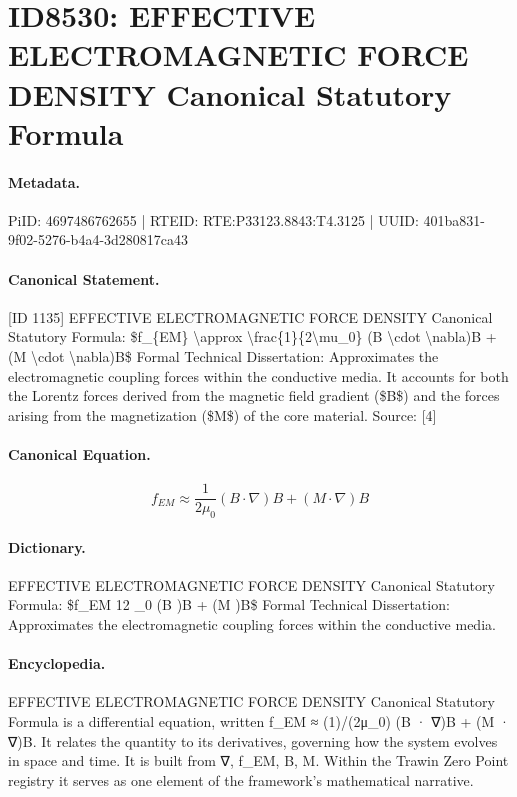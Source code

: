 \section*{ID8530: EFFECTIVE ELECTROMAGNETIC FORCE DENSITY Canonical Statutory Formula}
\paragraph{Metadata.}
PiID: 4697486762655 | RTEID: RTE:P33123.8843:T4.3125 | UUID: 401ba831-9f02-5276-b4a4-3d280817ca43

\paragraph{Canonical Statement.}
[ID 1135] EFFECTIVE ELECTROMAGNETIC FORCE DENSITY Canonical Statutory Formula: \$f\_\{EM\} \textbackslash{}approx \textbackslash{}frac\{1\}\{2\textbackslash{}mu\_0\} (B \textbackslash{}cdot \textbackslash{}nabla)B + (M \textbackslash{}cdot \textbackslash{}nabla)B\$ Formal Technical Dissertation: Approximates the electromagnetic coupling forces within the conductive media. It accounts for both the Lorentz forces derived from the magnetic field gradient (\$B\$) and the forces arising from the magnetization (\$M\$) of the core material. Source: [4]

\paragraph{Canonical Equation.}
\[
f_{EM} \approx \frac{1}{2\mu_0} (B \cdot \nabla)B + (M \cdot \nabla)B
\]

\paragraph{Dictionary.}
EFFECTIVE ELECTROMAGNETIC FORCE DENSITY Canonical Statutory Formula: \$f\_EM 12 \_0 (B )B + (M )B\$ Formal Technical Dissertation: Approximates the electromagnetic coupling forces within the conductive media.

\paragraph{Encyclopedia.}
EFFECTIVE ELECTROMAGNETIC FORCE DENSITY Canonical Statutory Formula is a differential equation, written f\_EM ≈ (1)/(2μ\_0) (B · ∇)B + (M · ∇)B. It relates the quantity to its derivatives, governing how the system evolves in space and time. It is built from ∇, f\_EM, B, M. Within the Trawin Zero Point registry it serves as one element of the framework's mathematical narrative.
